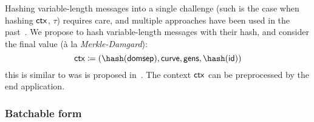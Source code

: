 \documentclass[runningheads,11pt]{article}
\begin{document}

Hashing variable-length messages into a single challenge (such is the case when hashing $\mathsf{ctx}$, $\tau$) requires care, and multiple approaches have been used in the past~\cite{EPRINT:Hamburg17, hash-to-curve}.
We propose to hash variable-length messages with their hash, and consider the final value (à la \emph{Merkle-Damgard}):
 \[
   \ctx \defeq (\hash(\domsepctx), \curvectx, \generatorsctx, \hash(\idctx))
 \]
 this is similar to was is proposed in~\cite{bip-schnorr}.
 The context $\mathsf{ctx}$ can be preprocessed by the end application.


\subsubsection{Batchable form}
\end{document}

